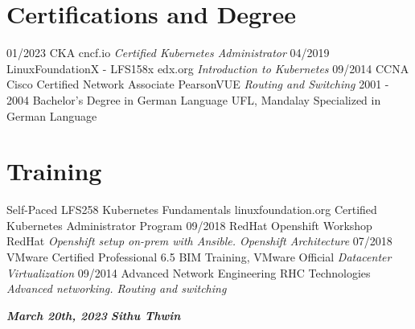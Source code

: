\documentclass[]{friggeri-cv}
\begin{document}
\section{Certifications and Degree}
\begin{entrylist}
  \entry
  {01/2023}
  {CKA}
  {cncf.io}
  {\emph{Certified Kubernetes Administrator}}
  \entry
  {04/2019}
  {LinuxFoundationX - LFS158x}
  {edx.org}
  {\emph{Introduction to Kubernetes}}
  \entry
  {09/2014}
  {CCNA Cisco Certified Network Associate}
  {PearsonVUE}
  {\emph{Routing and Switching}}
  \entry
  {2001 - 2004}
  {Bachelor's Degree in German Language}
  {UFL, Mandalay}
  {Specialized in German Language\\ }
  
\end{entrylist}
\section{Training}
\begin{entrylist}
  \entry
  {Self-Paced}
  {LFS258 Kubernetes Fundamentals}
  {linuxfoundation.org}
  {Certified Kubernetes Administrator Program}
  \entry
  {09/2018}
  {RedHat Openshift Workshop}
  {RedHat}
  {\emph{Openshift setup on-prem with Ansible. Openshift Architecture}}	\entry
  {07/2018}
  {VMware Certified Professional 6.5}
  {BIM Training, VMware Official}
  {\emph{Datacenter Virtualization}}
  \entry
  {09/2014}
  {Advanced Network Engineering}
  {RHC Technologies}
  {\emph{Advanced networking. Routing and switching}}
\end{entrylist}

\textbf{\emph{March 20th, 2023}}
\hfill
\textbf{\emph{Sithu Thwin}}
\end{document}

